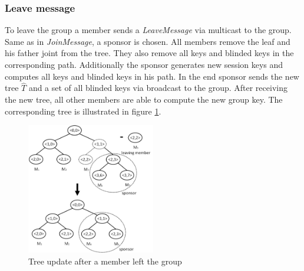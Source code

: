\subsubsection{Leave message}
To leave the group a member sends a \textit{LeaveMessage} via multicast to the group. Same as in \textit{JoinMessage}, a sponsor is chosen. All members remove the leaf and his father joint from the tree. They also remove all keys and blinded keys in the corresponding path. Additionally the sponsor generates new session keys and computes all keys and blinded keys in his path. In the end sponsor sends the new tree $\widehat{T}$ and a set of all blinded keys via broadcast to the group. After receiving the new tree, all other members are able to compute the new group key. The corresponding tree is illustrated in figure \ref{fig:tgdh_leave}.
\begin{figure}[!h]
\centering\includegraphics[width=0.5\textwidth]{Images/tgdh_leave}
\caption{Tree update after a member left the group}
\label{fig:tgdh_leave}
\end{figure}\noindent